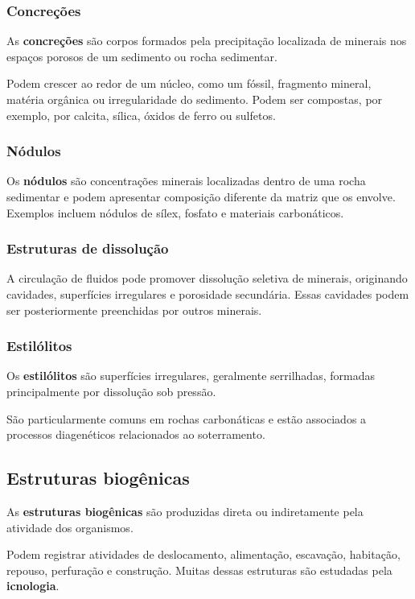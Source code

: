 \documentclass[a4paper,12pt]{article}
\theoremstyle{definition}
\theoremstyle{definition}
\theoremstyle{definition}
\begin{document}
\subsubsection{Concreções}

As \textbf{concreções} são corpos formados pela precipitação localizada de
minerais nos espaços porosos de um sedimento ou rocha sedimentar.

Podem crescer ao redor de um núcleo, como um fóssil, fragmento mineral, matéria
orgânica ou irregularidade do sedimento. Podem ser compostas, por exemplo, por
calcita, sílica, óxidos de ferro ou sulfetos.

\subsubsection{Nódulos}

Os \textbf{nódulos} são concentrações minerais localizadas dentro de uma rocha
sedimentar e podem apresentar composição diferente da matriz que os envolve.
Exemplos incluem nódulos de sílex, fosfato e materiais carbonáticos.

\subsubsection{Estruturas de dissolução}

A circulação de fluidos pode promover dissolução seletiva de minerais,
originando cavidades, superfícies irregulares e porosidade secundária. Essas
cavidades podem ser posteriormente preenchidas por outros minerais.

\subsubsection{Estilólitos}

Os \textbf{estilólitos} são superfícies irregulares, geralmente serrilhadas,
formadas principalmente por dissolução sob pressão.

São particularmente comuns em rochas carbonáticas e estão associados a
processos diagenéticos relacionados ao soterramento.

\subsection{Estruturas biogênicas}

As \textbf{estruturas biogênicas} são produzidas direta ou indiretamente pela
atividade dos organismos.

Podem registrar atividades de deslocamento, alimentação, escavação, habitação,
repouso, perfuração e construção. Muitas dessas estruturas são estudadas pela
\textbf{icnologia}.
\end{document}

